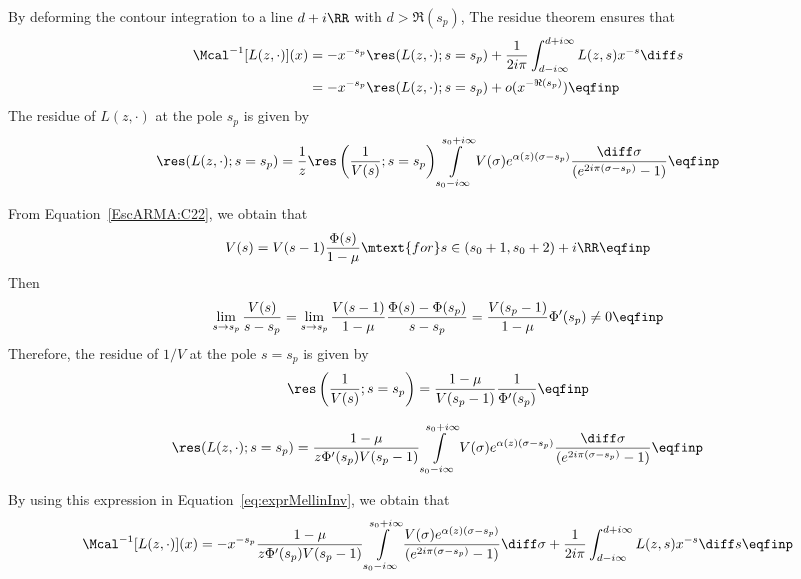 By deforming the contour integration to a line $d+i\RR$ with $d > \Re(s_p)$, The residue theorem ensures that
\begin{subequations}
\begin{align}
    \Mcal^{-1}[L(z,\cdot)](x) 
    &= - x^{-s_p}\res(L(z,\cdot);s = s_p) +  \frac{1}{2i\pi} \int_{d-i\infty}^{d+i\infty} L(z,s)x^{-s}\diff s\\
    &= - x^{-s_p}\res(L(z,\cdot);s = s_p) + o(x^{-\Re(s_p)})
    \eqfinp
\end{align}
\label{eq:exprMellinInv}
\end{subequations}
The residue of $L(z,\cdot)$ at the pole $s_p$ is given by 
\begin{equation*}
    \res(L(z,\cdot);s = s_p) 
    = 
    \frac{1}{z}\res\left( \frac{1}{V(s)}; s = s_p\right) \int\limits_{s_0-i\infty}^{s_0+i\infty}
    V(\sigma) e^{ \alpha(z)(\sigma-s_p)}
   \frac{\diff \sigma}{(e^{2i\pi(\sigma-s_p)}-1)}
   \eqfinp
\end{equation*}

From Equation~\eqref{EscARMA:C22}, we obtain that
$$ V(s) = V(s-1)\frac{\Phi(s)}{1-\mu}
        \mtext{for}
        s \in (s_0+1, s_0+2) + i\RR
        \eqfinp$$
Then 
$$ \lim_{s\to s_p} \frac{V(s)}{s-s_p} 
= \lim_{s\to s_p} \frac{V(s-1)}{1-\mu} \frac{\Phi(s)-\Phi(s_p)}{s-s_p}
=  \frac{V(s_p-1)}{1-\mu} \Phi'(s_p) \neq 0 \eqfinp$$
Therefore, the  residue of $1/V$ at the pole $s = s_p$ is given by 
$$ \res\left( \frac{1}{V(s)}; s = s_p\right) = \frac{1-\mu}{V(s_p-1)} \frac{1}{\Phi'(s_p)} \eqfinp$$

\begin{equation}
    \res(L(z,\cdot);s = s_p) 
    = 
     \frac{1-\mu}{z \Phi'(s_p) V(s_p-1)}
     \int\limits_{s_0-i\infty}^{s_0+i\infty}
    V(\sigma) e^{ \alpha(z)(\sigma-s_p)}
   \frac{\diff \sigma}{(e^{2i\pi(\sigma-s_p)}-1)}
   \eqfinp
\end{equation}

By using this expression in Equation~\eqref{eq:exprMellinInv}, we obtain that 
\begin{equation*}
    \Mcal^{-1}[L(z,\cdot)](x) 
    = - x^{-s_p}\frac{1-\mu}{z \Phi'(s_p) V(s_p-1)}
     \int\limits_{s_0-i\infty}^{s_0+i\infty}
     \frac{V(\sigma) e^{ \alpha(z)(\sigma-s_p)}
  }{(e^{2i\pi(\sigma-s_p)}-1)}\diff \sigma + \frac{1}{2i\pi} \int_{d-i\infty}^{d+i\infty} L(z,s)x^{-s}\diff s
    \eqfinp
\end{equation*}

